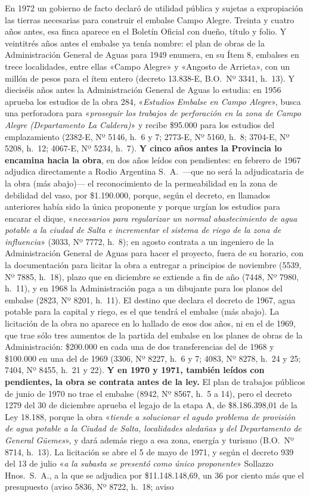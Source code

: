 En 1972 un gobierno de facto declaró de utilidad pública y sujetas a expropiación las tierras
necesarias para construir el embalse Campo Alegre. Treinta y cuatro años antes, esa finca
aparece en el Boletín Oficial con dueño, título y folio. Y veintitrés años antes el embalse ya tenía nombre: el plan de obras de la Administración General de Aguas para 1949 enumera, en su Ítem 8, embalses en trece localidades, entre ellas «Campo Alegre» y «Angosto de Arrieta», con un millón de pesos para el ítem entero (decreto 13.838-E, B.O.\ Nº 3341, h.\ 13). Y dieciséis años antes la Administración General de Aguas lo estudia: en 1956 aprueba los estudios de la obra 284, «\textit{Estudios Embalse en Campo Alegre}», busca una perforadora para «\textit{proseguir los trabajos de perforación en la zona de Campo Alegre (Departamento La Caldera)}» y recibe \$95.000 para los estudios del emplazamiento (2382-E, Nº 5146, h.\ 6 y 7; 2773-E, Nº 5160, h.\ 8; 3704-E, Nº 5208, h.\ 12; 4067-E, Nº 5234, h.\ 7). \textbf{Y cinco años antes la Provincia lo encamina hacia la obra}, en dos años leídos con pendientes: en febrero de 1967 adjudica directamente a Rodio Argentina S.\ A.\ ---que no será la adjudicataria de la obra (más abajo)--- el reconocimiento de la permeabilidad en la zona de debilidad del vaso, por \$1.190.000, porque, según el decreto, en llamados anteriores había sido la única proponente y porque urgían los estudios para encarar el dique, «\textit{necesarios para regularizar un normal abastecimiento de agua potable a la ciudad de Salta e incrementar el sistema de riego de la zona de influencia}» (3033, Nº 7772, h.\ 8); en agosto contrata a un ingeniero de la Administración General de Aguas para hacer el proyecto, fuera de su horario, con la documentación para licitar la obra a entregar a principios de noviembre (5539, Nº 7885, h.\ 18), plazo que en diciembre se extiende a fin de año (7448, Nº 7980, h.\ 11), y en 1968 la Administración paga a un dibujante para los planos del embalse (2823, Nº 8201, h.\ 11). El destino que declara el decreto de 1967, agua potable para la capital y riego, es el que tendrá el embalse (más abajo). La licitación de la obra no aparece en lo hallado de esos dos años, ni en el de 1969, que trae sólo tres aumentos de la partida del embalse en los planes de obras de la Administración: \$200.000 en cada una de dos transferencias del de 1968 y \$100.000 en una del de 1969 (3306, Nº 8227, h.\ 6 y 7; 4083, Nº 8278, h.\ 24 y 25; 7404, Nº 8455, h.\ 21 y 22). \textbf{Y en 1970 y 1971, también leídos con pendientes, la obra se contrata antes de la ley.} El plan de trabajos públicos de junio de 1970 no trae el embalse (8942, Nº 8567, h.\ 5 a 14), pero el decreto 1279 del 30 de diciembre aprueba el legajo de la etapa A, de \$8.186.398,01 de la Ley 18.188, porque la obra «\textit{tiende a solucionar el agudo problema de provisión de agua potable a la Ciudad de Salta, localidades aledañas y del Departamento de General Güemes}», y dará además riego a esa zona, energía y turismo (B.O.\ Nº 8714, h.\ 13). La licitación se abre el 5 de mayo de 1971, y según el decreto 939 del 13 de julio «\textit{a la subasta se presentó como único proponente}» Sollazzo Hnos.\ S.\ A., a la que se adjudica por \$11.148.148,69, un 36 por ciento más que el presupuesto (aviso 5836, Nº 8722, h.\ 18; aviso 